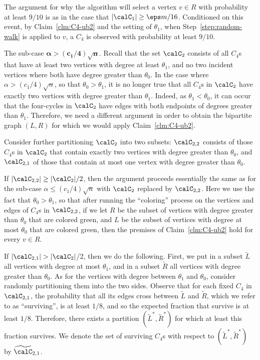 \documentclass{article}
\begin{document}
The argument for why the algorithm will select a vertex $v\in R$ with  probability at least $9/10$ is as in the case that $|\calC_1| \geq \eps m/16$. Conditioned on this event, by Claim~\ref{clm:C4-ub2} and the setting of $\theta_1$, when Step~\ref{step:random-walk} is applied to $v$, a $C_4$ is observed with probability at least $9/10$.


\smallskip\noindent
\textsf{The sub-case $\mathbf{\alpha> (c_1/4)\sqrt n}$.}
Recall that the set $\calC_2$ consists of all $C_4$s that have at least two vertices with degree at least $\theta_1$, and no two incident vertices where both have degree greater than $\theta_0$.
In the case where $\alpha>(c_1/4)\sqrt n$, so that $\theta_0>\theta_1$, it is no longer true that all $C_4$s  in $\calC_2$ have exactly two vertices with degree greater than $\theta_1$. Indeed, as $\theta_1<\theta_0$, it can occur that the four-cycles in $\calC_2$ have edges with both endpoints of degrees greater than $\theta_1$. Therefore, we need a different argument in order to obtain the bipartite graph $(L,R)$ for which we would apply Claim~\ref{clm:C4-ub2}.

Consider further partitioning $\calC_2$ into two subsets: $\calC_{2,2}$ consists of those $C_4$s in $\calC_2$ that contain exactly two vertices with degree greater than $\theta_0$, and $\calC_{2,1}$ of those that contain at most one vertex with degree greater than $\theta_0$. 

If $|\calC_{2,2}| \geq |\calC_2|/2$, then 
the argument  proceeds essentially the same as for the sub-case  $\alpha \leq (c_1/4)\sqrt  n$ with $\calC_2$ replaced by $\calC_{2,2}$. Here we use the fact that $\theta_0 > \theta_1$, so that after running the ``coloring'' process on the vertices and edges of $C_4$s in $\calC_{2,2}$, if we let $R$ be the subset of vertices with degree greater than $\theta_0$ that are colored green, and $L$ be the subset of vertices with degree at most $\theta_0$ that are colored green, then the premises of Claim~\ref{clm:C4-ub2} hold for every $v\in R$.

 If $|\calC_{2,1}|>|\calC_2|$/2, then
we do the following. First, we put in 
a  subset $\widetilde{L}$ all vertices with degree at most $\theta_1$, and in a subset $\widetilde{R}$ all vertices with degree greater than $\theta_0$. As for the vertices with degree between $\theta_1$ and $\theta_0$, consider  randomly partitioning  them into the two sides. Observe that for each fixed $C_4$ in $\calC_{2,1}$, the probability that all its edges cross between $\widetilde{L}$ and $\widetilde{R}$, which we refer to as ``surviving'', is at least $1/8$, and so the expected fraction that survive is at least $1/8$. Therefore, there exists a partition 
$(\widetilde{L}^*,\widetilde{R}^*)$ 
for which at least this fraction survives. We denote the set of surviving $C_4$s with respect to $(\widetilde{L}^*,\widetilde{R}^*)$ by $\widetilde{\calC}_{2,1}$. 
\end{document}
